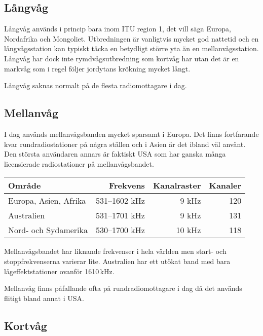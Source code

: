 \subsection{Långvåg}

Långvåg används i princip bara inom ITU region 1, det vill säga Europa,
Nordafrika och Mongoliet. Utbredningen är vanligtvis mycket god nattetid och
en långvågsstation kan typiskt täcka en betydligt större yta än en
mellanvågsstation. Långvåg har dock inte rymdvågsutbredning som kortvåg har
utan det är en markvåg som i regel följer jordytans krökning mycket långt.

Långvåg saknas normalt på de flesta radiomottagare i dag.

\subsection{Mellanvåg}
\label{rundradio-frekvenser-mellanvåg}

I dag används mellanvågsbanden mycket sparsamt i Europa. Det finns fortfarande
kvar rundradiostationer på några ställen och i Asien är det ibland väl använt.
Den största användaren annars är faktiskt USA som har ganska många
licensierade radiostationer på mellanvågsbandet.

\begin{table}[h]
\centering
\begin{tabular}{lrrr}
	\bf Område            &  \bf Frekvens & \bf Kanalraster & \bf Kanaler \\ \hline
	Europa, Asien, Afrika & 531--1602 kHz &          9  kHz &         120 \\
	Australien            & 531--1701 kHz &           9 kHz &         131 \\
	Nord- och Sydamerika  & 530--1700 kHz &          10 kHz &         118
\end{tabular}
\end{table}

Mellanvågsbandet har liknande frekvenser i hela världen men start- och
stoppfrekvenserna varierar lite. Australien har ett utökat band med bara
lågeffektstationer ovanför 1610\,kHz.

Mellanvåg finns påfallande ofta på rundradiomottagare i dag då det används
flitigt bland annat i USA.


\subsection{Kortvåg}
\label{rundradio-frekvenser-kortvåg}

